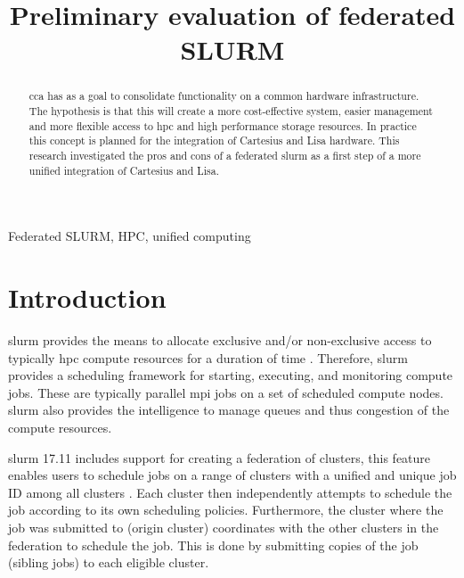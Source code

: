 \documentclass[conference]{IEEEtran}
\begin{document}
\title{Preliminary evaluation of federated SLURM}

\author{
}

\maketitle

\begin{abstract}
\gls{cca} has as a goal to consolidate functionality on a common hardware infrastructure. The hypothesis is that this will create a more cost-effective system, easier management and more flexible access to \gls{hpc} and high performance storage resources. In practice this concept is planned for the integration of Cartesius \cite{cartesius-userinfo} and Lisa \cite{lisa-userinfo} hardware. This research investigated the pros and cons of a federated \gls{slurm} as a first step of a more unified integration of Cartesius and Lisa.
\end{abstract}

\begin{IEEEkeywords}
Federated SLURM, HPC, unified computing
\end{IEEEkeywords}


\section{Introduction}
\gls{slurm} provides the means to allocate exclusive and/or non-exclusive access to typically \gls{hpc} compute resources for a duration of time \cite{wiki-slurm}. Therefore, \gls{slurm} provides a scheduling framework for starting, executing, and monitoring compute jobs. These are typically parallel \gls{mpi} jobs on a set of scheduled compute nodes. \gls{slurm} also provides the intelligence to manage queues and thus congestion of the compute resources.

\gls{slurm} 17.11 includes support for creating a federation of clusters, this feature enables users to schedule jobs on a range of clusters with a unified and unique job ID among all clusters \cite{slurm-federated-guide}. Each cluster then independently attempts to schedule the job according to its own scheduling policies. Furthermore, the cluster where the job was submitted to (origin cluster) coordinates with the other clusters in the federation to schedule the job. This is done by submitting copies of the job (sibling jobs) to each eligible cluster.
\end{document}
